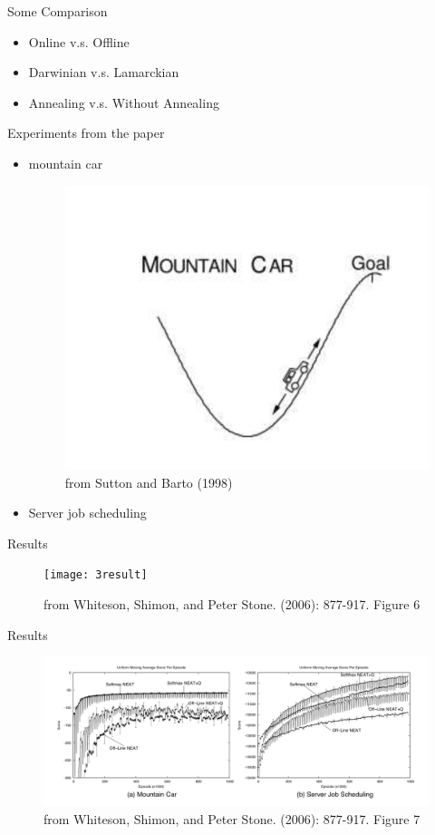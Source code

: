 \documentclass{beamer}
\begin{document}
\begin{frame}
\begin{block}{Some Comparison}
   \begin{itemize}
      \item Online v.s. Offline
      \item Darwinian v.s. Lamarckian
      \item Annealing v.s. Without Annealing
   \end{itemize}
  \end{block}
\end{frame}

\begin{frame}{Experiments from the paper}
  \begin{itemize}
    \item mountain car
    \begin{figure}[htbp]
      \includegraphics[width = .5\textwidth]{mountaincar}
      \caption{from Sutton and Barto (1998)}
     \end{figure}
    \item Server job scheduling
  \end{itemize}
\end{frame}




\begin{frame}{Results}
  \begin{figure}[htbp]
    \texttt{[image: 3result]}
    \caption{from Whiteson, Shimon, and Peter Stone. (2006): 877-917. Figure 6}
   \end{figure}
  
\end{frame}

\begin{frame}{Results}
  \begin{figure}[htbp]
    \includegraphics[width = 1.1\textwidth, left]{explorationneat}
    \caption{from Whiteson, Shimon, and Peter Stone. (2006): 877-917. Figure 7}
   \end{figure}
  
\end{frame}
\end{document}

